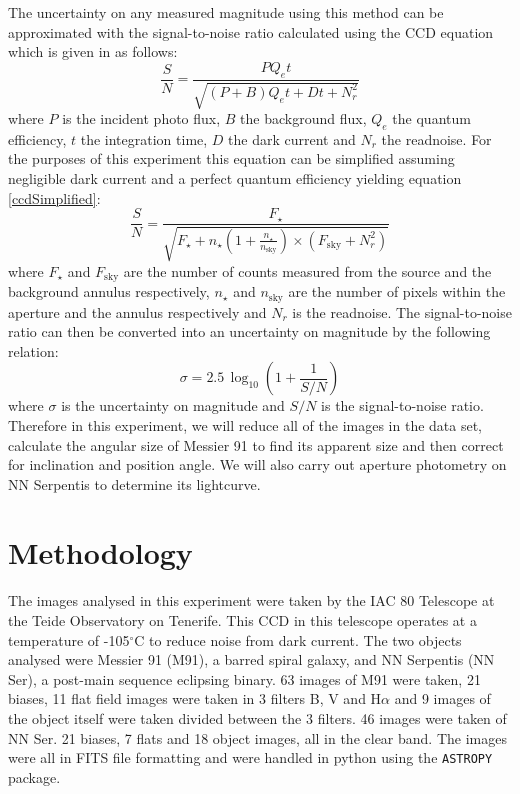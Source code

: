 \documentclass[%
reprint,
amsmath,amssymb,
aps,
]{revtex4-2}
\begin{document}
			The uncertainty on any measured magnitude using this method can be approximated with the signal-to-noise ratio calculated using the CCD equation which is given in as follows\cite{ccdEquation}:
			\begin{equation}
				\frac{S}{N} = \frac{P Q_e t}{\sqrt{\left(P + B\right)Q_e t + Dt + N_r^2}}
				\label{eq:ccd}
			\end{equation}where $P$ is the incident photo flux, $B$ the background flux, $Q_e$ the quantum efficiency, $t$ the integration time, $D$ the dark current and $N_r$ the readnoise. For the purposes of this experiment this equation can be simplified assuming negligible dark current and a perfect quantum efficiency yielding equation \ref{ccdSimplified}\cite{manual}:
			\begin{equation}
				\frac{S}{N} = \frac{F_\star}{\sqrt{F_\star + n_\star \left( 1 + \frac{n_\star}{n_\text{sky}}\right) \times \left(F_\text{sky} + N_r^2\right)}}
				\label{ccdSimplified}
			\end{equation}where $F_\star$ and $F_\text{sky}$ are the number of counts measured from the source and the background annulus respectively, $n_\star$ and $n_\text{sky}$ are the number of pixels within the aperture and the annulus respectively and $N_r$ is the readnoise. The signal-to-noise ratio can then be converted into an uncertainty on magnitude by the following relation:
			\begin{equation}
				\sigma = 2.5 \, \log_{10}\left(1 + \frac{1}{S/N}\right)
				\label{eq:sigUncertainty}
			\end{equation}where $\sigma$ is the uncertainty on magnitude and $S/N$ is the signal-to-noise ratio.\\
		
		Therefore in this experiment, we will reduce all of the images in the data set, calculate the angular size of Messier 91 to find its apparent size and then correct for inclination and position angle. We will also carry out aperture photometry on NN Serpentis to determine its lightcurve.
	 
	\section{Methodology}
	
		The images analysed in this experiment were taken by the IAC 80 Telescope at the Teide Observatory on Tenerife. This CCD in this telescope operates at a temperature of -105$^\circ$C to reduce noise from dark current\cite{telescope}. The two objects analysed were Messier 91 (M91), a barred spiral galaxy\cite{messier}, and NN Serpentis (NN Ser), a post-main sequence eclipsing binary\cite{Horner_2012}. 63 images of M91 were taken, 21 biases, 11 flat field images were taken in 3 filters B, V and H$\alpha$ and 9 images of the object itself were taken divided between the 3 filters. 46 images were taken of NN Ser. 21 biases, 7 flats and 18 object images, all in the clear band. The images were all in FITS file formatting and were handled in python using the \texttt{ASTROPY} package.
	
\end{document}

